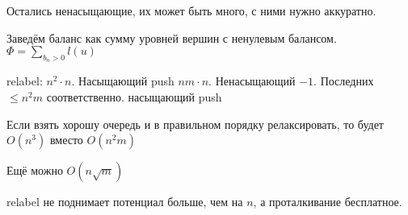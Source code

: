 Остались ненасыщающие, их может быть много, с ними нужно аккуратно.

Заведём баланс как сумму уровней вершин с ненулевым балансом. $\Phi = \sum_{b_n >0} l(u)$

relabel: $n^2 \cdot n$. Насыщающий push $nm\cdot n$. Ненасыщающий $-1$. Последних $\leqslant n^2m$ соответственно.
насыщающий push

Если взять хорошу очередь и в правильном порядку релаксировать, то будет $O(n^3)$ вместо $O(n^2m)$

Ещё можно $O(n \sqrt{m} )$

relabel не поднимает потенциал больше, чем на $n$, а проталкивание бесплатное.
